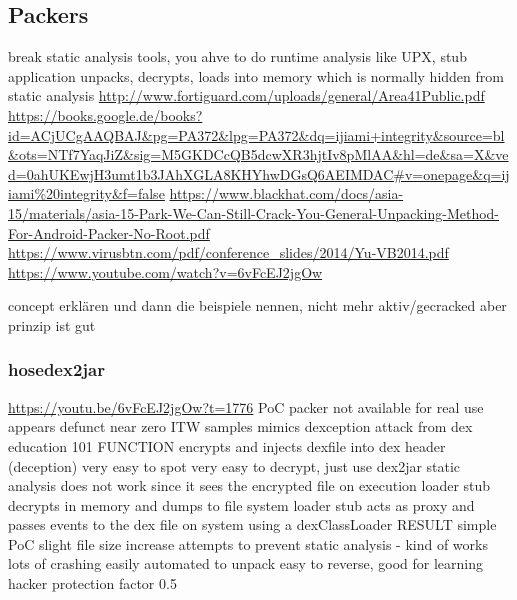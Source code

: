 \subsection{Packers}
break static analysis tools, you ahve to do runtime analysis\newline
like UPX, stub application unpacks, decrypts, loads into memory which is normally hidden from static analysis\newline
\url{http://www.fortiguard.com/uploads/general/Area41Public.pdf}\newline
\url{https://books.google.de/books?id=ACjUCgAAQBAJ\&pg=PA372\&lpg=PA372\&dq=ijiami+integrity\&source=bl\&ots=NTf7YaqJiZ\&sig=M5GKDCcQB5dcwXR3hjtIv8pMlAA\&hl=de\&sa=X\&ved=0ahUKEwjH3umt1b3JAhXGLA8KHYhwDGsQ6AEIMDAC\#v=onepage\&q=ijiami%20integrity\&f=false}\newline
\url{https://www.blackhat.com/docs/asia-15/materials/asia-15-Park-We-Can-Still-Crack-You-General-Unpacking-Method-For-Android-Packer-No-Root.pdf}\newline
\url{https://www.virusbtn.com/pdf/conference_slides/2014/Yu-VB2014.pdf}\newline
\url{https://www.youtube.com/watch?v=6vFcEJ2jgOw}\newline

concept erklären und dann die beispiele nennen, nicht mehr aktiv/gecracked aber prinzip ist gut\newline

\subsubsection{hosedex2jar}
\url{https://youtu.be/6vFcEJ2jgOw?t=1776}\newline
PoC packer\newline
not available for real use\newline
appears defunct\newline
near zero ITW samples\newline
mimics dexception attack from dex education 101\newline
FUNCTION\newline
encrypts and injects dexfile into dex header (deception)\newline
very easy to spot\newline
very easy to decrypt, just use dex2jar\newline
static analysis does not work since it sees the encrypted file\newline
on execution loader stub decrypts in memory and dumps to file system\newline
loader stub acts as proxy and passes events to the dex file on system using a dexClassLoader\newline
RESULT\newline
simple PoC\newline
slight file size increase\newline
attempts to prevent static analysis - kind of works\newline
lots of crashing\newline
easily automated to unpack\newline
easy to reverse, good for learning\newline
hacker protection factor 0.5
